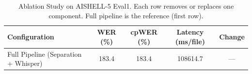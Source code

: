 \begin{table}[h]
\centering
\caption{Ablation Study on AISHELL-5 Eval1. Each row removes or replaces one component. Full pipeline is the reference (first row).}
\label{tab:ablation}
\begin{tabular}{lcccc}
\toprule
\textbf{Configuration} & \textbf{WER (\%)} & \textbf{cpWER (\%)} & \textbf{Latency (ms/file)} & \textbf{Change} \\
\midrule
Full Pipeline (Separation + Whisper) & 183.4 & 183.4 & 108614.7 & — \\
\bottomrule
\end{tabular}
\end{table}
